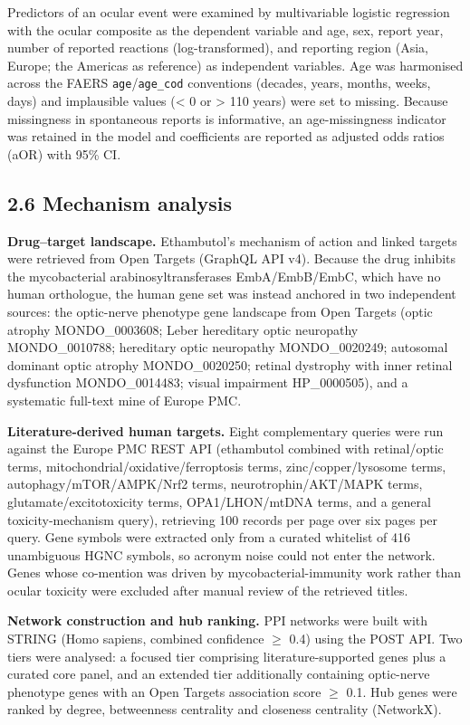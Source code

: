 \documentclass[utf8]{FrontiersinVancouver}
\begin{document}
Predictors of an ocular event were examined by multivariable logistic regression with the ocular composite as the dependent variable and age, sex, report year, number of reported reactions (log-transformed), and reporting region (Asia, Europe; the Americas as reference) as independent variables. Age was harmonised across the FAERS \texttt{age}/\texttt{age\_cod} conventions (decades, years, months, weeks, days) and implausible values (< 0 or > 110 years) were set to missing. Because missingness in spontaneous reports is informative, an age-missingness indicator was retained in the model and coefficients are reported as adjusted odds ratios (aOR) with 95\% CI.

\subsection{2.6 Mechanism analysis}

\textbf{Drug--target landscape.} Ethambutol's mechanism of action and linked targets were retrieved from Open Targets (GraphQL API v4). Because the drug inhibits the mycobacterial arabinosyltransferases EmbA/EmbB/EmbC, which have no human orthologue, the human gene set was instead anchored in two independent sources: the optic-nerve phenotype gene landscape from Open Targets (optic atrophy MONDO\_0003608; Leber hereditary optic neuropathy MONDO\_0010788; hereditary optic neuropathy MONDO\_0020249; autosomal dominant optic atrophy MONDO\_0020250; retinal dystrophy with inner retinal dysfunction MONDO\_0014483; visual impairment HP\_0000505), and a systematic full-text mine of Europe PMC.

\textbf{Literature-derived human targets.} Eight complementary queries were run against the Europe PMC REST API (ethambutol combined with retinal/optic terms, mitochondrial/oxidative/ferroptosis terms, zinc/copper/lysosome terms, autophagy/mTOR/AMPK/Nrf2 terms, neurotrophin/AKT/MAPK terms, glutamate/excitotoxicity terms, OPA1/LHON/mtDNA terms, and a general toxicity-mechanism query), retrieving 100 records per page over six pages per query. Gene symbols were extracted only from a curated whitelist of 416 unambiguous HGNC symbols, so acronym noise could not enter the network. Genes whose co-mention was driven by mycobacterial-immunity work rather than ocular toxicity were excluded after manual review of the retrieved titles.

\textbf{Network construction and hub ranking.} PPI networks were built with STRING (Homo sapiens, combined confidence $\geq$ 0.4) using the POST API. Two tiers were analysed: a focused tier comprising literature-supported genes plus a curated core panel, and an extended tier additionally containing optic-nerve phenotype genes with an Open Targets association score $\geq$ 0.1. Hub genes were ranked by degree, betweenness centrality and closeness centrality (NetworkX).
\end{document}
